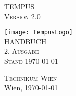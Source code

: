 %
%

\begin{titlepage}
\begin{center}
\vspace*{30mm} \Huge TEMPUS\\
\vspace*{10mm}
\large \textsc{Version 2.0}

\vfill \texttt{[image: TempusLogo]}\\
\vspace*{20mm}
\textsc{\LARGE{HANDBUCH}\\
\vspace*{5mm}
\large{2. Ausgabe\\Stand \today}}

	
\vfill \textsc{Technikum Wien}\\

Wien, \today
\end{center}
\end{titlepage}
